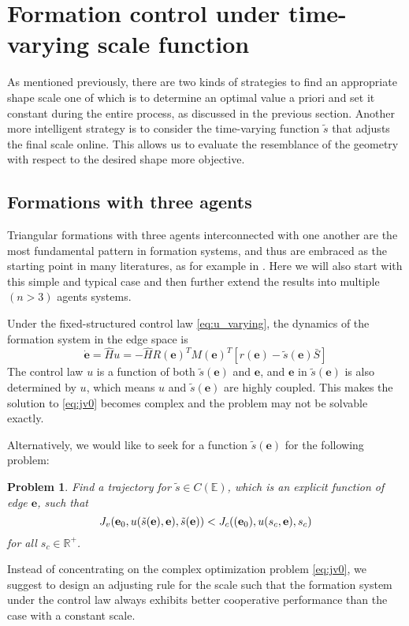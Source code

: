 \documentclass[times]{rncauth}
\newcommand{\be}{\ensuremath \mathbf{e}}
\newtheorem{prob}{Problem}[section]
\begin{document}
\section{Formation control under time-varying scale
function}\label{sec:varying}
As mentioned previously, there are two kinds of strategies to find
an appropriate shape scale one of which  is to determine an optimal
value a priori and set it constant during the entire process, as
discussed in the previous section. Another more intelligent strategy
is to consider the time-varying function $\tilde{s}$ that adjusts
the final scale online. This allows us to evaluate the resemblance of the geometry with respect to the desired shape more objective.



\subsection{Formations with three agents}
 Triangular
formations with three agents interconnected with one another are the
most fundamental pattern in formation systems, and thus are
embraced as the starting point in many literatures, as for example
in
\cite{Yu09minimalPersistent,Huang10optimalFormation,Anderson08UAV}.
Here we will also start with this simple and typical case and then
further extend the results into multiple $(n>3)$ agents systems.

Under the fixed-structured control law  \eqref{eq:u_varying}, the
dynamics of the formation system in the edge space is
\begin{equation}\label{eq:mydes_M}
  \dot{\mathbf{e}}=\hat{H}u=-\hat{H}R(\mathbf{e})^T M(\mathbf{e})^T [r(\mathbf{e})-\tilde{s}(\mathbf{e})\bar{S}]
\end{equation}
The control law $u$ is a function of both $\tilde{s}(\mathbf{e})$
and $\mathbf{e}$, and $\mathbf{e}$ in $\tilde{s}(\mathbf{e})$ is
also determined by $u$, which means $u$ and $\tilde{s}(\mathbf{e})$
are highly coupled. This makes the solution to \eqref{eq:jv0}
becomes complex and the problem may not be solvable  exactly.

Alternatively, we would like to seek for a function
$\tilde{s}(\mathbf{e})$ for the following problem:
\begin{prob}\label{prob:threeOptimal}
Find a trajectory for $\tilde{s}\in C(\mathbb{E})$, which is an
explicit function of edge $\mathbf{e}$, such that
$$J_v(\mathbf{e}_0,u(\tilde{s}(\mathbf{e}),\be),\tilde{s}(\mathbf{e}))<J_c((\mathbf{e}_0),u(s_c,\be),s_c)$$
for all $s_c\in\mathbb{R}^+$.
\end{prob}
Instead of concentrating on the complex optimization problem
\eqref{eq:jv0}, we suggest to design an  adjusting rule for the scale such that the formation system under the control law always exhibits better
cooperative performance than the case with a constant scale.
\end{document}
